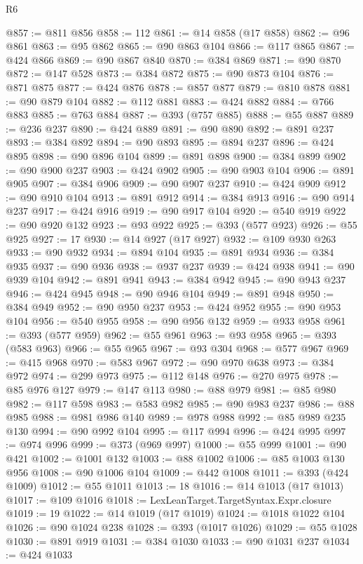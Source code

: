 \begin{lexlean}{R6}
\begin{coremodule}
@857 := @811 @856
@858 := 112
@861 := @14 @858 (@17 @858)
@862 := @96 @861
@863 := @95 @862
@865 := @90 @863 @104
@866 := @117 @865
@867 := @424 @866
@869 := @90 @867 @840
@870 := @384 @869
@871 := @90 @870
@872 := @147 @528
@873 := @384 @872
@875 := @90 @873 @104
@876 := @871 @875
@877 := @424 @876
@878 := @857 @877
@879 := @810 @878
@881 := @90 @879 @104
@882 := @112 @881
@883 := @424 @882
@884 := @766 @883
@885 := @763 @884
@887 := @393 (@757 @885)
@888 := @55 @887
@889 := @236 @237
@890 := @424 @889
@891 := @90 @890
@892 := @891 @237
@893 := @384 @892
@894 := @90 @893
@895 := @894 @237
@896 := @424 @895
@898 := @90 @896 @104
@899 := @891 @898
@900 := @384 @899
@902 := @90 @900 @237
@903 := @424 @902
@905 := @90 @903 @104
@906 := @891 @905
@907 := @384 @906
@909 := @90 @907 @237
@910 := @424 @909
@912 := @90 @910 @104
@913 := @891 @912
@914 := @384 @913
@916 := @90 @914 @237
@917 := @424 @916
@919 := @90 @917 @104
@920 := @540 @919
@922 := @90 @920 @132
@923 := @93 @922
@925 := @393 (@577 @923)
@926 := @55 @925
@927 := 17
@930 := @14 @927 (@17 @927)
@932 := @109 @930 @263
@933 := @90 @932
@934 := @894 @104
@935 := @891 @934
@936 := @384 @935
@937 := @90 @936
@938 := @937 @237
@939 := @424 @938
@941 := @90 @939 @104
@942 := @891 @941
@943 := @384 @942
@945 := @90 @943 @237
@946 := @424 @945
@948 := @90 @946 @104
@949 := @891 @948
@950 := @384 @949
@952 := @90 @950 @237
@953 := @424 @952
@955 := @90 @953 @104
@956 := @540 @955
@958 := @90 @956 @132
@959 := @933 @958
@961 := @393 (@577 @959)
@962 := @55 @961
@963 := @93 @958
@965 := @393 (@583 @963)
@966 := @55 @965
@967 := @93 @304
@968 := @577 @967
@969 := @415 @968
@970 := @583 @967
@972 := @90 @970 @638
@973 := @384 @972
@974 := @299 @973
@975 := @112 @148
@976 := @270 @975
@978 := @85 @976 @127
@979 := @147 @113
@980 := @88 @979
@981 := @85 @980
@982 := @117 @598
@983 := @583 @982
@985 := @90 @983 @237
@986 := @88 @985
@988 := @981 @986 @140
@989 := @978 @988
@992 := @85 @989 @235 @130
@994 := @90 @992 @104
@995 := @117 @994
@996 := @424 @995
@997 := @974 @996
@999 := @373 (@969 @997)
@1000 := @55 @999
@1001 := @90 @421
@1002 := @1001 @132
@1003 := @88 @1002
@1006 := @85 @1003 @130 @956
@1008 := @90 @1006 @104
@1009 := @442 @1008
@1011 := @393 (@424 @1009)
@1012 := @55 @1011
@1013 := 18
@1016 := @14 @1013 (@17 @1013)
@1017 := @109 @1016
@1018 := LexLeanTarget.TargetSyntax.Expr.closure
@1019 := 19
@1022 := @14 @1019 (@17 @1019)
@1024 := @1018 @1022 @104
@1026 := @90 @1024 @238
@1028 := @393 (@1017 @1026)
@1029 := @55 @1028
@1030 := @891 @919
@1031 := @384 @1030
@1033 := @90 @1031 @237
@1034 := @424 @1033

\end{coremodule}
\end{lexlean}
